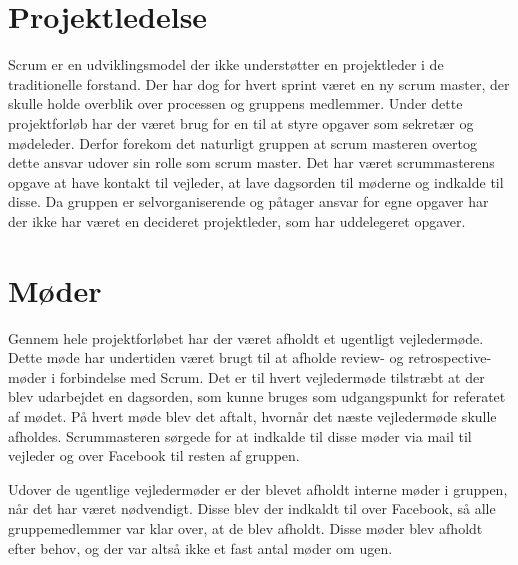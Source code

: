 \section{Projektledelse}
Scrum er en udviklingsmodel der ikke understøtter en projektleder i de traditionelle forstand. Der har dog for hvert sprint været en ny scrum master, der skulle holde overblik over processen og gruppens medlemmer. Under dette projektforløb har der været brug for en til at styre opgaver som sekretær og mødeleder. Derfor forekom det naturligt gruppen at scrum masteren overtog dette ansvar udover sin rolle som scrum master. Det har været scrummasterens opgave at have kontakt til vejleder, at lave dagsorden til møderne og indkalde til disse. Da gruppen er selvorganiserende og påtager ansvar for egne opgaver har der ikke har været en decideret projektleder, som har uddelegeret opgaver. 

\section{Møder}
Gennem hele projektforløbet har der været afholdt et ugentligt vejledermøde. Dette møde har undertiden været brugt til at afholde review- og retrospective-møder i forbindelse med Scrum. Det er til hvert vejledermøde tilstræbt at der blev udarbejdet en dagsorden, som kunne bruges som udgangspunkt for referatet af mødet. På hvert møde blev det aftalt, hvornår det næste vejledermøde skulle afholdes. Scrummasteren sørgede for at indkalde til disse møder via mail til vejleder og over Facebook til resten af gruppen. 

Udover de ugentlige vejledermøder er der blevet afholdt interne møder i gruppen, når det har været nødvendigt. Disse blev der indkaldt til over Facebook, så alle gruppemedlemmer var klar over, at de blev afholdt. Disse møder blev afholdt efter behov, og der var altså ikke et fast antal møder om ugen. 

